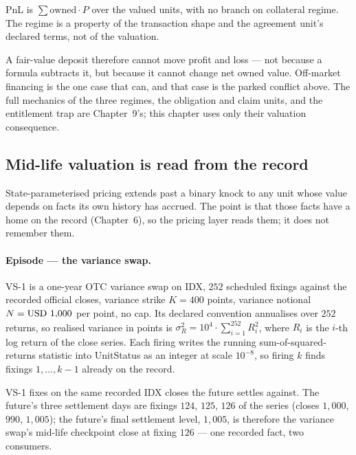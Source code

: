 \begin{principle}
PnL is $\sum \mathrm{owned}\cdot P$ over the valued units, with no branch on
collateral regime. The regime is a property of the transaction shape and the
agreement unit's declared terms, not of the valuation.
\end{principle}

A fair-value deposit therefore cannot move profit and loss --- not because a
formula subtracts it, but because it cannot change net owned value. Off-market
financing is the one case that can, and that case is the parked conflict above.
The full mechanics of the three regimes, the obligation and claim units, and
the entitlement trap are Chapter~9's; this chapter uses only their valuation
consequence.

\subsection{Mid-life valuation is read from the record}

State-parameterised pricing extends past a binary knock to any unit whose value
depends on facts its own history has accrued. The point is that those facts
have a home on the record (Chapter~6), so the pricing layer reads them; it does
not remember them.

\paragraph{Episode --- the variance swap.}
VS-1 is a one-year OTC variance swap on IDX, $252$ scheduled fixings against
the recorded official closes, variance strike $K = 400$ points, variance
notional $N = \mbox{USD~1,000}$ per point, no cap. Its declared convention
annualises over $252$ returns, so realised variance in points is
$\sigma^2_R = 10^4 \cdot \sum_{i=1}^{252} R_i^2$, where $R_i$ is the $i$-th log
return of the close series. Each firing writes the running
sum-of-squared-returns statistic into UnitStatus as an integer at scale
$10^{-8}$, so firing $k$ finds fixings $1,\dots,k-1$ already on the record.

VS-1 fixes on the same recorded IDX closes the future settles against. The
future's three settlement days are fixings $124$, $125$, $126$ of the series
(closes $1{,}000$, $990$, $1{,}005$); the future's final settlement level,
$1{,}005$, is therefore the variance swap's mid-life checkpoint close at fixing
$126$ --- one recorded fact, two consumers.

